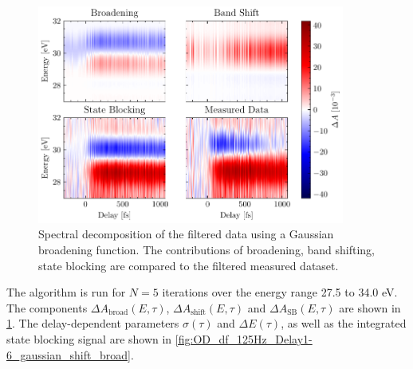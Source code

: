 \begin{figure}
	\centering
	\includegraphics[width=0.9\textwidth]{figures/chap4/OD_df_125Hz_Delay1-6_gaussian_fit_result.pdf}
	\caption{Spectral decomposition of the filtered data using a Gaussian broadening function. The contributions of broadening, band shifting, state blocking are compared to the filtered measured dataset.}
	\label{fig:OD_df_125Hz_Delay1-6_gaussian_fit_result}
\end{figure}

The algorithm is run for $N=5$ iterations over the energy range 27.5 to 34.0 eV. The components $\Delta A_{\textrm{broad}}(E,\tau)$, $\Delta A_{\textrm{shift}}(E,\tau)$ and $\Delta A_{\textrm{SB}}(E,\tau)$ are shown in \cref{fig:OD_df_125Hz_Delay1-6_gaussian_fit_result}. The delay-dependent parameters $\sigma(\tau)$ and $\Delta E(\tau)$, as well as the integrated state blocking signal are shown in \cref{fig:OD_df_125Hz_Delay1-6_gaussian_shift_broad}.

